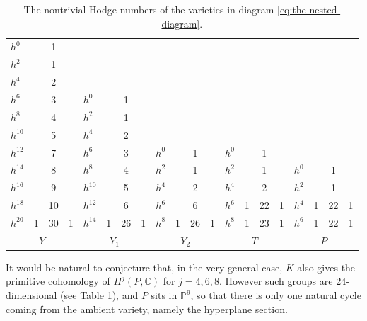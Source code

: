 \documentclass[JEP,XML,SOM,Unicode,NoEqCountersInSection]{cedram}
\theoremstyle{plain}
\theoremstyle{definition}
\newcommand{\CC}{\mathbb{C}}
\newcommand{\PP}{\mathbb{P}}
\begin{document}
\begin{table}[htb]
\centering
\smaller\smaller
\begin{tabular}{||l | c c c  ||l | c c c  ||l | c c c  ||l | c c c  || l | c c c  ||}
\hline
$h^0$ & & 1 & &  & & & &  & & & &  & & & &  & & & \\
$h^2$ & & 1 & &  & & & &  & & & &  & & & &  & & &  \\
$h^4$ & & 2 & &  & & & &  & & & &  & & & &  & & &  \\
$h^6$ & & 3 & &  $h^0$ & & 1 & &  & & & &  & & & &  & & &  \\
$h^8$ & & 4 & &  $h^2$ & & 1 & &  & & & &  & & & &  & & & \\
$h^{10}$ & & 5 & &  $h^4$ & & 2 & &  & & & &  & & & &  & & & \\
$h^{12}$ & & 7 & &  $h^6$ & & 3 & &  $h^0$ & & 1 & &  $h^0$ & & 1 & &  & & & \\
$h^{14}$ & & 8 & &  $h^8$ & & 4 & &  $h^2$& & 1 & &  $h^2$& & 1 & &  $h^0$ & & 1 & \\
$h^{16}$ & & 9 & & $h^{10}$ & & 5 & &  $h^4$ & & 2 & &  $h^4$ & & 2 & &  $h^2$ & & 1 & \\
$h^{18}$ & & 10 & & $h^{12}$ & & 6 & & $h^6$ & & 6 & &  $h^6$ & 1 & 22 & 1& $h^4$ & 1 & 22 & 1 \\
$h^{20}$ & 1 & 30 & 1 &  $h^{14}$ & 1 & 26 & 1 &  $h^8$ & 1 & 26 & 1 &  $h^8$ & 1 & 23 & 1 & $h^6$ & 1 & 22 & 1 \\
\hline
\multicolumn{4}{||c||}{\multirow{2}{*}{$Y$}} & \multicolumn{4}{c||}{\multirow{2}{*}{$Y_1$}} & \multicolumn{4}{c||}{\multirow{2}{*}{$Y_2$}}& \multicolumn{4}{c||}{\multirow{2}{*}{$T$}} & \multicolumn{4}{c||}{\multirow{2}{*}{$P$}}\\
\multicolumn{4}{||c||}{} & \multicolumn{4}{c||}{} & \multicolumn{4}{c||}{} & \multicolumn{4}{c||}{} & \multicolumn{4}{c||}{} \\ \hline
\end{tabular}
\vspace*{5pt}
\caption{The nontrivial Hodge numbers of the varieties in diagram \eqref{eq:the-nested-diagram}.}\label{tab}
\vspace*{-1.5\baselineskip}
\end{table}

It would be natural to conjecture that, in the very general case, $K$ also gives the primitive
cohomology of $H^j(P,\CC)$ for $j=4,6,8$. However such groups are $24$\nobreakdash-dimen\-sional (see Table \ref{tab}),
and $P$ sits in $\PP^9$, so that there is only one natural cycle coming from the ambient variety,
namely the hyperplane section.
\end{document}
